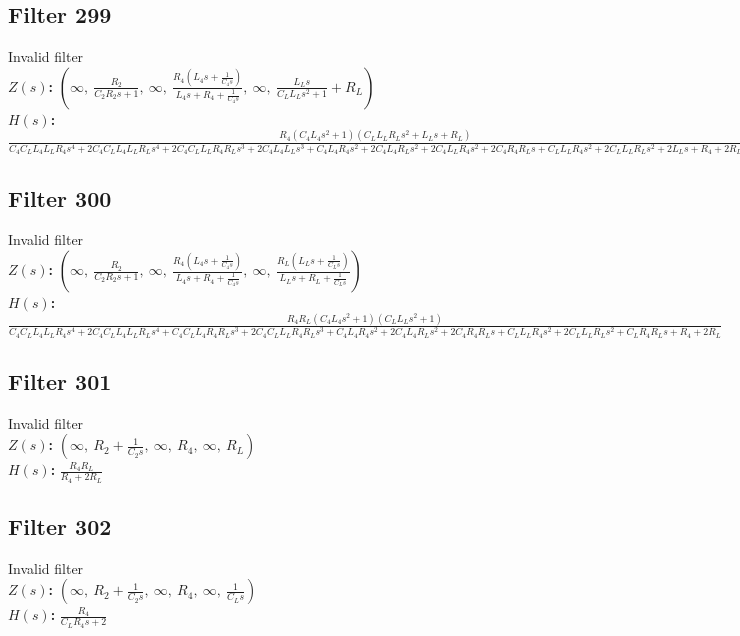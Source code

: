 \documentclass{article}
\begin{document}
\subsection*{Filter 299}
Invalid filter \\ 
\textbf{$Z(s)$:} $\left( \infty, \  \frac{R_{2}}{C_{2} R_{2} s + 1}, \  \infty, \  \frac{R_{4} \left(L_{4} s + \frac{1}{C_{4} s}\right)}{L_{4} s + R_{4} + \frac{1}{C_{4} s}}, \  \infty, \  \frac{L_{L} s}{C_{L} L_{L} s^{2} + 1} + R_{L}\right)$ \\ 
\textbf{$H(s)$:} $\frac{R_{4} \left(C_{4} L_{4} s^{2} + 1\right) \left(C_{L} L_{L} R_{L} s^{2} + L_{L} s + R_{L}\right)}{C_{4} C_{L} L_{4} L_{L} R_{4} s^{4} + 2 C_{4} C_{L} L_{4} L_{L} R_{L} s^{4} + 2 C_{4} C_{L} L_{L} R_{4} R_{L} s^{3} + 2 C_{4} L_{4} L_{L} s^{3} + C_{4} L_{4} R_{4} s^{2} + 2 C_{4} L_{4} R_{L} s^{2} + 2 C_{4} L_{L} R_{4} s^{2} + 2 C_{4} R_{4} R_{L} s + C_{L} L_{L} R_{4} s^{2} + 2 C_{L} L_{L} R_{L} s^{2} + 2 L_{L} s + R_{4} + 2 R_{L}}$ \\ 
\subsection*{Filter 300}
Invalid filter \\ 
\textbf{$Z(s)$:} $\left( \infty, \  \frac{R_{2}}{C_{2} R_{2} s + 1}, \  \infty, \  \frac{R_{4} \left(L_{4} s + \frac{1}{C_{4} s}\right)}{L_{4} s + R_{4} + \frac{1}{C_{4} s}}, \  \infty, \  \frac{R_{L} \left(L_{L} s + \frac{1}{C_{L} s}\right)}{L_{L} s + R_{L} + \frac{1}{C_{L} s}}\right)$ \\ 
\textbf{$H(s)$:} $\frac{R_{4} R_{L} \left(C_{4} L_{4} s^{2} + 1\right) \left(C_{L} L_{L} s^{2} + 1\right)}{C_{4} C_{L} L_{4} L_{L} R_{4} s^{4} + 2 C_{4} C_{L} L_{4} L_{L} R_{L} s^{4} + C_{4} C_{L} L_{4} R_{4} R_{L} s^{3} + 2 C_{4} C_{L} L_{L} R_{4} R_{L} s^{3} + C_{4} L_{4} R_{4} s^{2} + 2 C_{4} L_{4} R_{L} s^{2} + 2 C_{4} R_{4} R_{L} s + C_{L} L_{L} R_{4} s^{2} + 2 C_{L} L_{L} R_{L} s^{2} + C_{L} R_{4} R_{L} s + R_{4} + 2 R_{L}}$ \\ 
\subsection*{Filter 301}
Invalid filter \\ 
\textbf{$Z(s)$:} $\left( \infty, \  R_{2} + \frac{1}{C_{2} s}, \  \infty, \  R_{4}, \  \infty, \  R_{L}\right)$ \\ 
\textbf{$H(s)$:} $\frac{R_{4} R_{L}}{R_{4} + 2 R_{L}}$ \\ 
\subsection*{Filter 302}
Invalid filter \\ 
\textbf{$Z(s)$:} $\left( \infty, \  R_{2} + \frac{1}{C_{2} s}, \  \infty, \  R_{4}, \  \infty, \  \frac{1}{C_{L} s}\right)$ \\ 
\textbf{$H(s)$:} $\frac{R_{4}}{C_{L} R_{4} s + 2}$ \\ 
\end{document}
